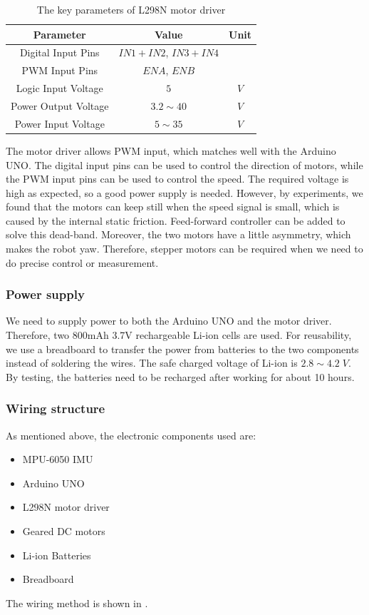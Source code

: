 \documentclass[9pt,a4paper,twocolumn]{tau-class/tau}
\begin{document}
\begin{table}[htbp]
    \centering
    \begin{tabular}{c c c}
    \toprule
    \textbf{Parameter} & \textbf{Value} & \textbf{Unit} \\
    \midrule
    Digital Input Pins & $IN1+IN2$, $IN3+IN4$ & \\
    PWM Input Pins & $ENA$, $ENB$ & \\
    \midrule
    Logic Input Voltage & $5$ & $V$ \\
    Power Output Voltage & $3.2\sim40$ & $V$ \\
    Power Input Voltage & $5\sim35$ & $V$ \\
    \bottomrule
    \end{tabular}
    \vspace{\baselineskip}
    \caption{The key parameters of L298N motor driver \cite{l298n_datasheet}}
    \label{tab:l298n_specifications}
\end{table}

The motor driver allows PWM input, which matches well with the Arduino UNO. The digital input pins can be used to control the direction of motors, while the PWM input pins can be used to control the speed. The required voltage is high as expected, so a good power supply is needed. However, by experiments, we found that the motors can keep still when the speed signal is small, which is caused by the internal static friction. Feed-forward controller can be added to solve this dead-band. Moreover, the two motors have a little asymmetry, which makes the robot yaw. Therefore, stepper motors can be required when we need to do precise control or measurement.

\subsubsection{Power supply}
We need to supply power to both the Arduino UNO and the motor driver. Therefore, two 800mAh 3.7V rechargeable Li-ion cells are used. For reusability, we use a breadboard to transfer the power from batteries to the two components instead of soldering the wires. The safe charged voltage of Li-ion is $2.8\sim4.2\;V$. By testing, the batteries need to be recharged after working for about 10 hours. 

\subsubsection{Wiring structure}
As mentioned above, the electronic components used are: 
\begin{itemize}
  \item MPU-6050 IMU
  \item Arduino UNO
  \item L298N motor driver
  \item Geared DC motors
  \item Li-ion Batteries
  \item Breadboard
\end{itemize}
The wiring method is shown in .
\end{document}
